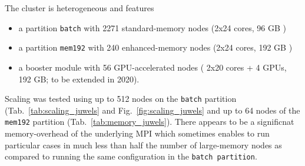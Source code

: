 The cluster is heterogeneous and features
\begin{itemize} 
  \item[(1)] a partition \texttt{batch} with 2271 standard-memory nodes (2x24 cores, 96 GB )
  \item[(2)] a partition \texttt{mem192} with 240 enhanced-memory nodes (2x24 cores, 192 GB )
  \item[(3)] a booster module with 56 GPU-accelerated nodes ( 2x20 cores + 4 GPUs, 192 GB; to be extended in 2020).
\end{itemize}

Scaling was tested using up to 512 nodes on the \texttt{batch} partition (Tab.~\ref{tab:scaling_juwels} and Fig.~\ref{fig:scaling_juwels}
and up to 64 nodes of the \texttt{mem192} partition (Tab.~\ref{tab:memory_juwels}).
There appears to be a significnat memory-overhead of the underlying MPI 
which sometimes enables to run particular cases in much less than half the number of large-memory nodes as compared 
to running the same configuration in the \texttt{batch partition}.

